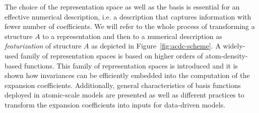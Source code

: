 The choice of the representation space as well as the basis is essential for an effective numerical description, i.e. a description that captures information with fewer number of coefficients. 
We will refer to the whole process of transforming a structure $A$ to a representation and then to a numerical description as \emph{featurization} of structure $A$ as depicted in Figure~\ref{fig:acdc-scheme}.
A widely-used family of representation spaces is based on higher orders of atom-density-based functions.
This family of representation spaces is introduced and it is shown how invariances can be efficiently embedded into the computation of the expansion coefficients.
Additionally, general characteristics of basis functions deployed in atomic-scale models are presented as well as different practices to transform the expansion coefficients into inputs for data-driven models.
 
